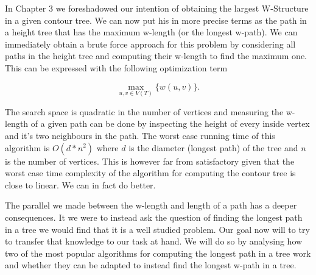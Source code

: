 In Chapter 3 we foreshadowed our intention of obtaining the largest W-Structure in a given contour tree. We can now put his in more precise terms as the path in a height tree that has the maximum w-length (or the longest w-path). We can immediately obtain a brute force approach for this problem by considering all paths in the height tree and computing their w-length to find the maximum one. This can be expressed with the following optimization term

$$ \max_{u, v \in V(T)}\{ w(u, v) \} .$$

The search space is quadratic in the number of vertices and measuring the w-length of a given path can be done by inspecting the height of every inside vertex and it's two neighbours in the path. The worst case running time of this algorithm is $O(d*n^2)$ where $d$ is the diameter (longest path) of the tree and $n$ is the number of vertices. This is however far from satisfactory given that the worst case time complexity of the algorithm for computing the contour tree is close to linear. We can in fact do better.

The parallel we made between the w-length and length of a path has a deeper consequences. It we were to instead ask the question of finding the longest path in a tree we would find that it is a well studied problem. Our goal now will to try to transfer that knowledge to our task at hand. We will do so by analysing how two of the most popular algorithms for computing the longest path in a tree work and whether they can be adapted to instead find the longest w-path in a tree.



